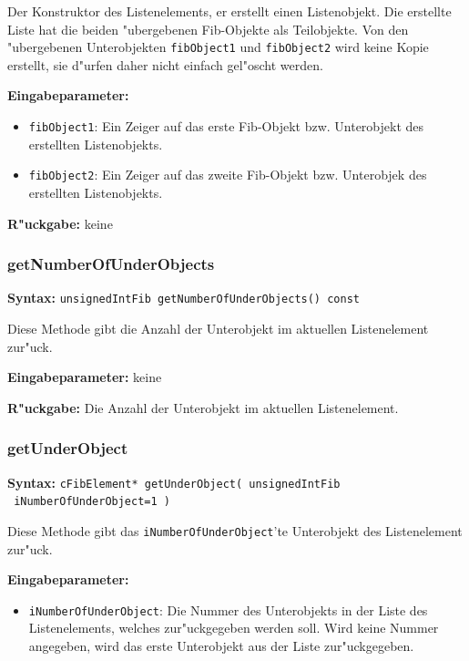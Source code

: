 \bigskip\noindent
Der Konstruktor des Listenelements, er erstellt einen Listenobjekt. Die erstellte Liste hat die beiden "ubergebenen Fib-Objekte als Teilobjekte.
Von den "ubergebenen Unterobjekten \verb|fibObject1| und \verb|fibObject2| wird keine Kopie erstellt, sie d"urfen daher nicht einfach gel"oscht werden.

\bigskip\noindent
\textbf{Eingabeparameter:}
\begin{itemize}
 \item \verb|fibObject1|: Ein Zeiger auf das erste Fib-Objekt bzw. Unterobjekt des erstellten Listenobjekts.
 \item \verb|fibObject2|: Ein Zeiger auf das zweite Fib-Objekt bzw. Unterobjek des erstellten Listenobjekts.
\end{itemize}

\bigskip\noindent
\textbf{R"uckgabe:} keine


\subsubsection{getNumberOfUnderObjects}

\textbf{Syntax:} \verb|unsignedIntFib getNumberOfUnderObjects() const|

\bigskip\noindent
Diese Methode gibt die Anzahl der Unterobjekt im aktuellen Listenelement zur"uck.

\bigskip\noindent
\textbf{Eingabeparameter:} keine

\bigskip\noindent
\textbf{R"uckgabe:} Die Anzahl der Unterobjekt im aktuellen Listenelement.


\subsubsection{getUnderObject}

\textbf{Syntax:} \verb|cFibElement* getUnderObject( unsignedIntFib| \\\verb| iNumberOfUnderObject=1 )|

\bigskip\noindent
Diese Methode gibt das \verb|iNumberOfUnderObject|'te Unterobjekt des Listenelement zur"uck.

\bigskip\noindent
\textbf{Eingabeparameter:} 
\begin{itemize}
 \item \verb|iNumberOfUnderObject|: Die Nummer des Unterobjekts in der Liste des Listenelements, welches zur"uckgegeben werden soll. Wird keine Nummer angegeben, wird das erste Unterobjekt aus der Liste zur"uckgegeben.
\end{itemize}

